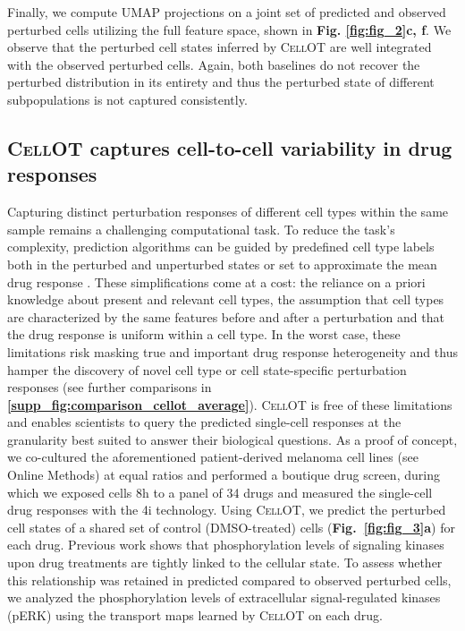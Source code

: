Finally, we compute UMAP projections \cite{umap} on a joint set of predicted and observed perturbed cells utilizing the full feature space, shown in \textbf{Fig. \ref{fig:fig_2}c, f}.
We observe that the perturbed cell states inferred by \textsc{CellOT} are well integrated with the observed perturbed cells. Again, both baselines do not recover the perturbed distribution in its entirety %
and thus the perturbed state of different subpopulations is not captured consistently.


\subsection{\textsc{CellOT} captures cell-to-cell variability in drug responses}
Capturing distinct perturbation responses of different cell types within the same sample remains a challenging computational task. To reduce the task's complexity, prediction algorithms can be guided by predefined cell type labels both in the perturbed and unperturbed states \cite{chen2020dissecting} or set to approximate the mean drug response \cite{lotfollahi2019scgen}.  These simplifications come at a cost: the reliance on a priori knowledge about present and relevant cell types, the assumption that cell types are characterized by the same features before and after a perturbation and that the drug response is uniform within a cell type.
In the worst case, these limitations risk masking true and important drug response heterogeneity  and thus hamper the discovery of novel cell type or cell state-specific perturbation responses (see further comparisons in \textbf{\ref{supp_fig:comparison_cellot_average}}).
\textsc{CellOT} is free of these limitations and enables scientists to query the predicted single-cell responses at the granularity best suited to answer their biological questions. As a proof of concept, we co-cultured the aforementioned patient-derived melanoma cell lines (see Online Methods) at equal ratios and performed a boutique drug screen, during which we exposed cells 8h to a panel of 34 drugs and measured the single-cell drug responses with the 4i technology. 
Using \textsc{CellOT}, 
we predict the perturbed cell states of a shared set of control (DMSO-treated) cells (\textbf{Fig.~\ref{fig:fig_3}a}) for each drug.
Previous work \cite{kramer2019cellular} shows that phosphorylation levels of signaling kinases upon drug treatments are tightly linked to the cellular state. 
To assess whether this relationship was retained in predicted compared to observed perturbed cells, we analyzed the phosphorylation levels of extracellular signal-regulated kinases (pERK) using the transport maps learned by \textsc{CellOT} on each drug.
